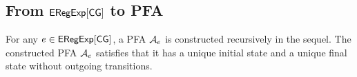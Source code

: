 \subsection{From ${\sf ERegExp}[\sf CG]$ to PFA}
\label{construction:pnfa}


For any $e \in {\sf ERegExp}[\sf CG]$, a PFA $\mathcal{A}_e$ is constructed recursively in the sequel. The constructed PFA $\mathcal{A}_e$ satisfies that it has a unique initial state and a unique final state  without outgoing transitions.
%
